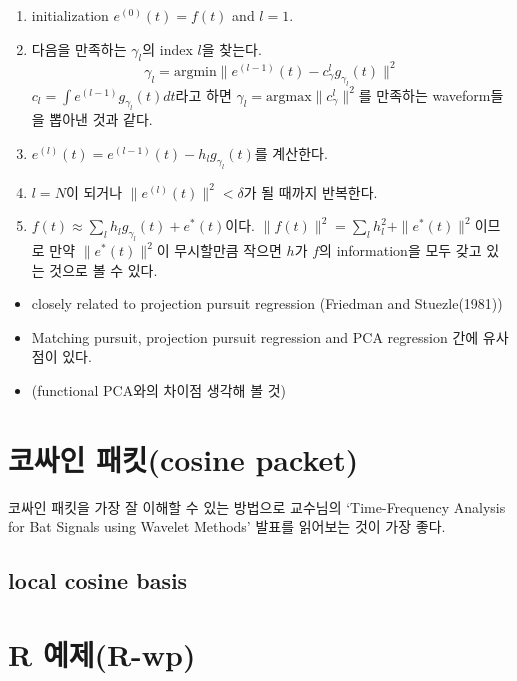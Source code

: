 \documentclass[b5paper,]{scrbook}
\theoremstyle{plain}
\theoremstyle{definition}
\numberwithin{equation}{section}
\begin{document}
\begin{enumerate}
\def\labelenumi{\arabic{enumi}.}
\item
  initialization \(e^{(0)}(t)=f(t)\) and \(l=1\).
\item
  다음을 만족하는 \(\gamma_{l}\)의 index \(l\)을 찾는다.
  \[\gamma_{l}=\text{argmin}\|e^{(l-1)}(t)-c_{\gamma}^{l}g_{\gamma_{l}}(t)\|^{2}\]
  \(c_{l}=\int e^{(l-1)}g_{\gamma_{l}}(t)dt\)라고 하면 \(\gamma_{l}=\text{argmax}\|c_{\gamma}^{l}\|^{2}\)를 만족하는 waveform들을 뽑아낸 것과 같다.
\item
  \(e^{(l)}(t)=e^{(l-1)}(t)-h_{l}g_{\gamma_{l}}(t)\)를 계산한다.
\item
  \(l=N\)이 되거나 \(\|e^{(l)}(t)\|^{2}<\delta\)가 될 때까지 반복한다.
\item
  \(f(t)\approx \sum_{l}h_{l}g_{\gamma_{l}}(t)+e^{*}(t)\)이다. \(\|f(t)\|^{2}=\sum_{l}h_{l}^{2}+\|e^{*}(t)\|^{2}\)이므로 만약 \(\|e^{*}(t)\|^{2}\)이 무시할만큼 작으면 \(h\)가 \(f\)의 information을 모두 갖고 있는 것으로 볼 수 있다.
\end{enumerate}

\begin{itemize}
\item
  closely related to projection pursuit regression (Friedman and Stuezle(1981))
\item
  Matching pursuit, projection pursuit regression and PCA regression 간에 유사점이 있다.
\item
  (functional PCA와의 차이점 생각해 볼 것)
\end{itemize}

\hypertarget{-cosine-packet}{%
\section{코싸인 패킷(cosine packet)}\label{-cosine-packet}}

코싸인 패킷을 가장 잘 이해할 수 있는 방법으로 교수님의 `Time-Frequency Analysis for Bat Signals using Wavelet Methods' 발표를 읽어보는 것이 가장 좋다.

\hypertarget{local-cosine-basis}{%
\subsection{local cosine basis}\label{local-cosine-basis}}

\hypertarget{r-r-wp}{%
\section{R 예제(R-wp)}\label{r-r-wp}}
\end{document}

